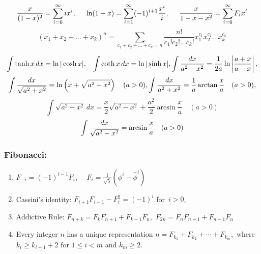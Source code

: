 \documentclass[12pt]{extarticle}
\begin{document}
\begin{multicols*}{2}
		
			\vfill
			$$ {x \over (1 - x)^2} = \sum_{i=0}^\infty i x^i, \hspace{5mm}
			\ln (1 + x) = \sum_{i=1}^\infty (-1)^{i+1} {x^i \over i}, \hspace{5mm} {x \over 1 - x - x^2} = \sum_{i=0}^\infty F_i x^i$$
			$$(x_1 + x_2 + ... + x_k)^n = \sum_{c_1 + c_2 + ... + c_k = n}
			\frac{n!}{c_1! c_2! ... c_k!} x_1^{c_1} x_2^{c_2} ... x_k^{c_k}$$
	
	$$\int \tanh x \, dx = \ln \vert \cosh x \vert, \hspace{3mm}
	\int \coth x \, dx = \ln \vert \sinh x \vert, \int {dx  \over a^2 - x^2} = {1 \over 2a} \ln\left\vert{a + x \over a - x}\right\vert, $$
	$$ \int {dx  \over \sqrt{a^2 + x^2}}= \ln \left(x + \sqrt{a^2 + x^2}\right) \quad (a > 0), \int {dx  \over a^2 + x^2}= \frac 1 a \arctan \frac x a \quad (a > 0), $$
	$$ \int \sqrt{a^2 - x^2} \, dx = \frac x 2 \sqrt{a^2 - x^2} + \frac{a^2}{2} \arcsin \frac x a \quad (a > 0) $$ $$\int {dx  \over \sqrt{a^2 - x^2}} = \arcsin \frac x a \quad (a > 0) $$
	
		\subsubsection*{Fibonacci:}
	\begin{enumerate}
		\itemsep0em 
		\item $F_{-i} = (-1)^{i-1} F_i$,  $ \quad F_i = \frac{1}{\sqrt{5}} \left(\phi^i - \hat{\phi}^i\right)$
		\item Cassini's identity: $F_{i+1} F_{i-1} - F^2_i = (-1)^i$ \quad \hbox{for $i > 0$,}
		\item Addictive Rule:
		\hspace{2mm}
		$F_{n+k} = F_k F_{n+1} + F_{k-1} F_n,$ \hspace{2mm}
		$F_{2n} = F_n F_{n+1} + F_{n-1} F_n$
		
		\item Every integer $n$ has a unique representation
		$ n = F_{k_1} + F_{k_2} + \cdots + F_{k_m},$
		where $k_i \geq k_{i+1} + 2$ for $1 \leq i < m$ and $k_m \geq 2$.
	\end{enumerate}

\end{multicols*}
\end{document}
